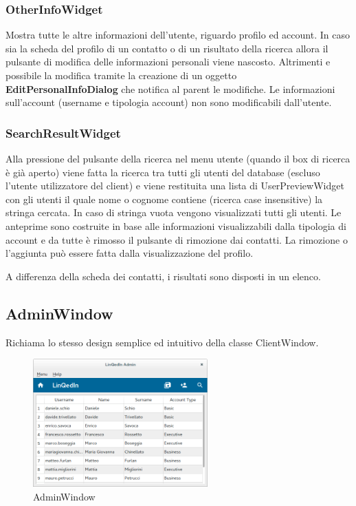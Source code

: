\documentclass[a4paper,10pt]{article}
\begin{document}
\subsubsection*{OtherInfoWidget}
Mostra tutte le altre informazioni dell'utente, riguardo profilo ed account. In caso sia la scheda del profilo di un contatto o di un risultato della ricerca allora il pulsante di modifica delle informazioni personali viene nascosto. Altrimenti e possibile la modifica tramite la creazione di un oggetto \textbf{EditPersonalInfoDialog} che notifica al parent le modifiche. Le informazioni sull'account (username e tipologia account) non sono modificabili dall'utente.

\subsubsection*{SearchResultWidget}
Alla pressione del pulsante della ricerca nel menu utente (quando il box di ricerca è già aperto) viene fatta la ricerca tra tutti gli utenti del database (escluso l'utente utilizzatore del client) e viene restituita una lista di UserPreviewWidget con gli utenti il quale nome o cognome contiene (ricerca case insensitive) la stringa cercata. In caso di stringa vuota vengono visualizzati tutti gli utenti. Le anteprime sono costruite in base alle informazioni visualizzabili dalla tipologia di account e da tutte è rimosso il pulsante di rimozione dai contatti. La rimozione o l'aggiunta può essere fatta dalla visualizzazione del profilo.

A differenza della scheda dei contatti, i risultati sono disposti in un elenco.

\subsection*{AdminWindow}
Richiama lo stesso design semplice ed intuitivo della classe ClientWindow.

\begin{figure}[!ht]
\centering
\includegraphics[width=0.6\textwidth]{AdminWindow.png}
\caption{AdminWindow}
\end{figure}
\end{document}

